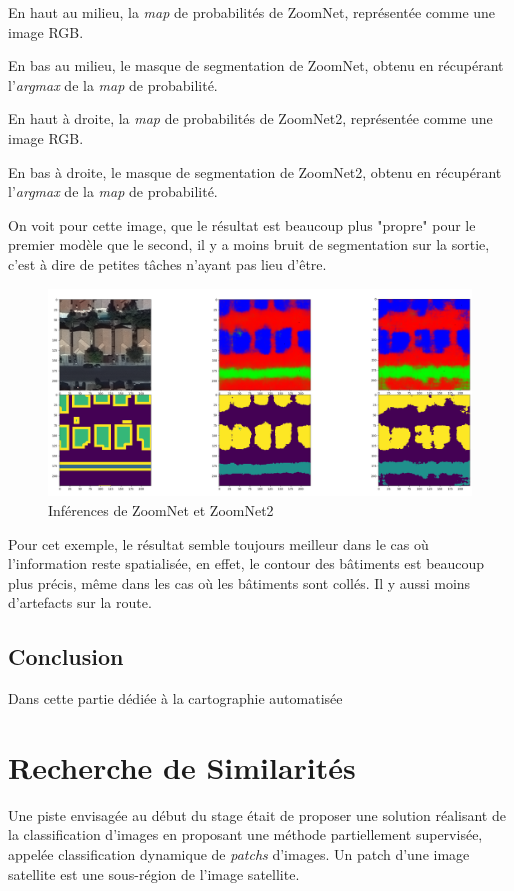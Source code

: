 \documentclass[a4paper, 11pt]{report}
\begin{document}
En haut au milieu, la \emph{map} de probabilités de ZoomNet, représentée comme une image RGB.

En bas au milieu, le masque de segmentation de ZoomNet, obtenu en récupérant l'\emph{argmax} de la \emph{map} de probabilité.

En haut à droite, la \emph{map} de probabilités de ZoomNet2, représentée comme une image RGB.

En bas à droite, le masque de segmentation de ZoomNet2, obtenu en récupérant l'\emph{argmax} de la \emph{map} de probabilité.

On voit pour cette image, que le résultat est beaucoup plus "propre" pour le premier modèle que le second, il y a moins bruit de segmentation sur la sortie, c'est à dire de petites tâches n'ayant pas lieu d'être.

\begin{figure}[H]
	\begin{center}
		\includegraphics[scale=0.225]{Images/ZoomNets_5000.png}
		\caption{Inférences de ZoomNet et ZoomNet2}
	\end{center}
\end{figure}

Pour cet exemple, le résultat semble toujours meilleur dans le cas où l'information reste spatialisée, en effet, le contour des bâtiments est beaucoup plus précis, même dans les cas où les bâtiments sont collés. Il y aussi moins d'artefacts sur la route.
\subsection{Conclusion}
Dans cette partie dédiée à la cartographie automatisée
\section{Recherche de Similarités}

Une piste envisagée au début du stage était de proposer une solution réalisant de la classification d'images en proposant une méthode partiellement supervisée, appelée classification dynamique de \emph{patchs} d'images.
Un patch d'une image satellite est une sous-région de l'image satellite.
\end{document}
